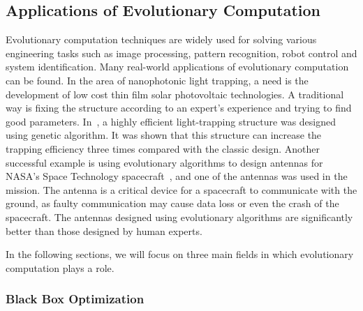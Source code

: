 \subsection{Applications of Evolutionary Computation}\label{sec:application_evolutionary_computation}

Evolutionary computation techniques are widely used for solving various engineering tasks such as image processing, pattern recognition, robot control and system identification. 
Many real-world applications of evolutionary computation can be found. In the area of nanophotonic light trapping, a need is the development of low cost thin film solar photovoltaic technologies. A traditional way is fixing the structure according to an expert's experience and trying to find good parameters. In~\cite{Wang2013}, a highly efficient light-trapping structure was designed using genetic algorithm. It was shown that this structure can increase the trapping efficiency three times compared with the classic design. Another successful example is using evolutionary algorithms to design antennas for NASA's Space Technology spacecraft~\cite{Hornby2011}, and one of the antennas was used in the mission. The antenna is a critical device for a spacecraft to communicate with the ground, as faulty communication may cause data loss or even the crash of the spacecraft. The antennas designed using evolutionary algorithms are significantly better than those designed by human experts. 

In the following sections, we will focus on three main fields in which evolutionary computation plays a role.



\subsubsection{Black Box Optimization}\label{sec:black_box_optimization}

